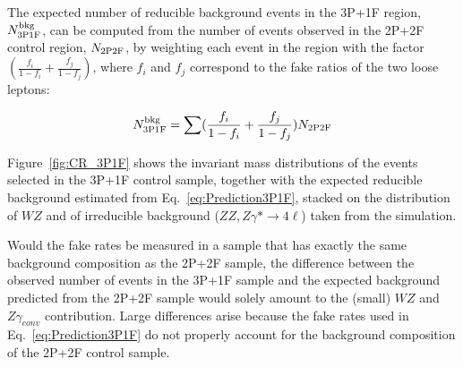 The expected number of reducible background events in the 3P+1F region,
$N^{\rm bkg}_{\rm 3P1F}$, can be computed from the number of events
observed in the 2P+2F control region, $N_{\rm 2P2F}$, by weighting each
event in the region with the factor $(\frac{f_{i}}{1-f_{i}}
+ \frac{f_{j}}{1-f_{j}})$, where $f_{i}$ and $f_{j}$ correspond to the
fake ratios of the two loose leptons:

\begin{equation} 
\label{eq:Prediction3P1F}
N^{\rm bkg}_{\rm 3P1F} = \sum (\frac{f_{i}}{1-f_{i}}
+ \frac{f_{j}}{1-f_{j}}) N_{\rm 2P2F}
\end{equation} 

Figure~\ref{fig:CR_3P1F} shows the invariant mass distributions of the
events selected in the 3P+1F control sample, together with the expected
reducible background estimated from Eq.~\ref{eq:Prediction3P1F},
stacked on the distribution
of $WZ$ and of irreducible background ($ZZ, Z\gamma* \to 4\ell$) taken from the simulation.

Would the fake rates be measured in a sample that has exactly the same
background composition as the 2P+2F sample, the difference between the
observed number of events in the 3P+1F sample and the expected background
predicted from the 2P+2F sample would solely amount to the (small) $WZ$ and $Z\gamma_{conv}$
contribution. Large differences arise because the fake rates used in
Eq.~\ref{eq:Prediction3P1F} do not properly account for the background
composition of the 2P+2F control sample.


